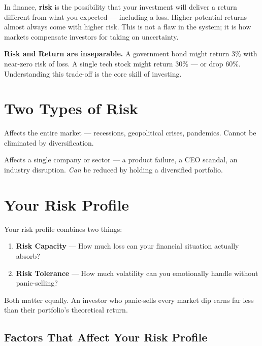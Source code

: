 \documentclass[12pt, a4paper]{book}
\begin{document}
In finance, \textbf{risk} is the possibility that your investment will deliver a return different from what you expected --- including a loss. Higher potential returns almost always come with higher risk. This is not a flaw in the system; it is how markets compensate investors for taking on uncertainty.

\begin{keybox}
\textbf{Risk and Return are inseparable.} A government bond might return 3\% with near-zero risk of loss. A single tech stock might return 30\% --- or drop 60\%. Understanding this trade-off is the core skill of investing.
\end{keybox}

\section{Two Types of Risk}

\begin{description}[leftmargin=1.5cm]
  \item[\textbf{Market Risk (Systematic)}] Affects the entire market --- recessions, geopolitical crises, pandemics. Cannot be eliminated by diversification.
  \item[\textbf{Specific Risk (Unsystematic)}] Affects a single company or sector --- a product failure, a CEO scandal, an industry disruption. \textit{Can} be reduced by holding a diversified portfolio.
\end{description}

\section{Your Risk Profile}

Your risk profile combines two things:
\begin{enumerate}[leftmargin=1.5cm]
  \item \textbf{Risk Capacity} --- How much loss can your financial situation actually absorb?
  \item \textbf{Risk Tolerance} --- How much volatility can you emotionally handle without panic-selling?
\end{enumerate}

Both matter equally. An investor who panic-sells every market dip earns far less than their portfolio's theoretical return.

\subsection{Factors That Affect Your Risk Profile}
\end{document}
